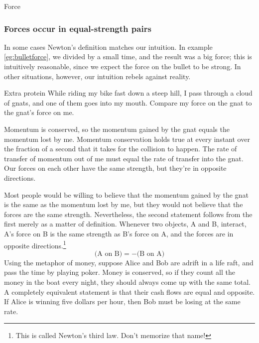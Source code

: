 \begin{envsubsection}{Force}
\subsubsection{Forces occur in equal-strength pairs}
In some cases Newton's definition matches our intuition. In example \ref{eg:bulletforce}, we divided by a small
time, and the result was a big force; this is intuitively reasonable, since we expect the force on the bullet to
be strong.
In other situations, however, our intuition rebels against reality.

\begin{eg}{Extra protein}\label{eg:extraprotein}
\egquestion
While riding my bike fast down a steep hill, I pass through a cloud of gnats, and one of them goes into my
mouth. Compare my force on the gnat to the gnat's force on me.

\eganswer
Momentum is conserved, so the momentum gained by the gnat equals the momentum lost by me. Momentum
conservation holds true at every instant over the fraction of a second that it takes for the collision to
happen. The rate of transfer
of momentum out of me must equal the rate of transfer into the gnat. Our forces on each other have the
same strength, but they're in opposite directions.
\end{eg}

\noindent Most people would be willing to believe that the momentum gained by the gnat is the same as the
momentum lost by me, but they would not believe that the forces are the same strength. Nevertheless, 
the second statement follows from the first merely as a matter of definition. 
Whenever two objects, A and B, interact,\label{thirdlaw}
A's force on B is the same strength as B's force on A, and the forces are in opposite directions.\footnote{This
is called Newton's third law. Don't memorize that name!}
\begin{equation*}
	\text{(A on B)} = -\text{(B on A)}
\end{equation*}
Using the metaphor of money, suppose Alice and Bob are adrift in a life raft, and pass the time by playing
poker. Money is conserved, so if they count all the money in the boat every night, they should always come
up with the same total. A completely equivalent statement is that their cash flows are equal and opposite.
If Alice is winning five dollars per hour, then Bob must be losing at the same rate.



\end{envsubsection}
